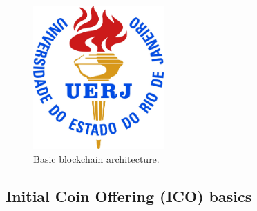 \begin{figure}[!ht]{\textwidth}
  \caption{Basic blockchain architecture.} \label{archain}
  \includegraphics[width=5cm]{config/logo_uerj_cor.jpg}
\end{figure}





\subsection{Initial Coin Offering (ICO) basics~\label{sec:ico}}


